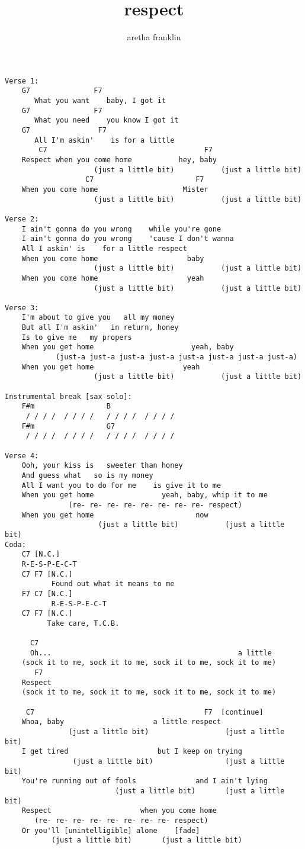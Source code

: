 \author{aretha franklin}
\title{respect}
\maketitle
\begin{verbatim}
Verse 1:
	G7               F7
	   What you want    baby, I got it
	G7               F7
	   What you need    you know I got it
	G7                F7
	   All I'm askin'    is for a little
	    C7                                     F7
	Respect when you come home           hey, baby
	                 (just a little bit)           (just a little bit)
	               C7                        F7
	When you come home                    Mister
	                 (just a little bit)           (just a little bit)

Verse 2:
	I ain't gonna do you wrong    while you're gone
	I ain't gonna do you wrong    'cause I don't wanna
	All I askin' is    for a little respect
	When you come home                     baby
	                 (just a little bit)           (just a little bit)
	When you come home                     yeah
	                 (just a little bit)           (just a little bit)

Verse 3:
	I'm about to give you   all my money
	But all I'm askin'   in return, honey
	Is to give me   my propers
	When you get home                       yeah, baby
		    (just-a just-a just-a just-a just-a just-a just-a just-a)
	When you get home                     yeah
	                 (just a little bit)           (just a little bit)

Instrumental break [sax solo]:
	F#m                 B
	 / / / /  / / / /   / / / /  / / / /
	F#m                 G7
	 / / / /  / / / /   / / / /  / / / /

Verse 4:
	Ooh, your kiss is   sweeter than honey
	And guess what   so is my money
	All I want you to do for me    is give it to me
	When you get home                yeah, baby, whip it to me
	           (re- re- re- re- re- re- re- re- respect)
	When you get home                        now
	                  (just a little bit)           (just a little bit)
Coda:
	C7 [N.C.]
	R-E-S-P-E-C-T
	C7 F7 [N.C.]
	       Found out what it means to me
	F7 C7 [N.C.]
	       R-E-S-P-E-C-T
	C7 F7 [N.C.]
	      Take care, T.C.B.

	  C7
	  Oh...                                            a little
	(sock it to me, sock it to me, sock it to me, sock it to me)
	   F7
	Respect
	(sock it to me, sock it to me, sock it to me, sock it to me)

	 C7                                        F7  [continue]
	Whoa, baby                     a little respect
	           (just a little bit)                  (just a little bit)
	I get tired                     but I keep on trying
	            (just a little bit)                 (just a little bit)
	You're running out of fools              and I ain't lying
	                      (just a little bit)       (just a little bit)
	Respect                     when you come home
	   (re- re- re- re- re- re- re- re- respect)
	Or you'll [unintelligible] alone    [fade]
	       (just a little bit)       (just a little bit)
\end{verbatim}